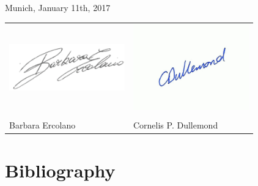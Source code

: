 \documentclass[10pt,fleqn,twoside,a4paper]{article}
\begin{document}
\vfill

\noindent Munich, January 11th, 2017\\

\noindent\begin{tabular}{p{8.5cm}p{8.5cm}}
\includegraphics[width=50mm]{signature_erc-eps-converted-to.pdf} & 
\includegraphics[width=50mm]{signature_dul-eps-converted-to.pdf} \\
\mbox{}\vspace{1em}\mbox{} & \\
Barbara Ercolano & Cornelis P. Dullemond \\
\end{tabular}
% 



%
\pagebreak[4]

%


\section{Bibliography}

\begingroup
\renewcommand{\section}[2]{}%


\endgroup
\end{document}
